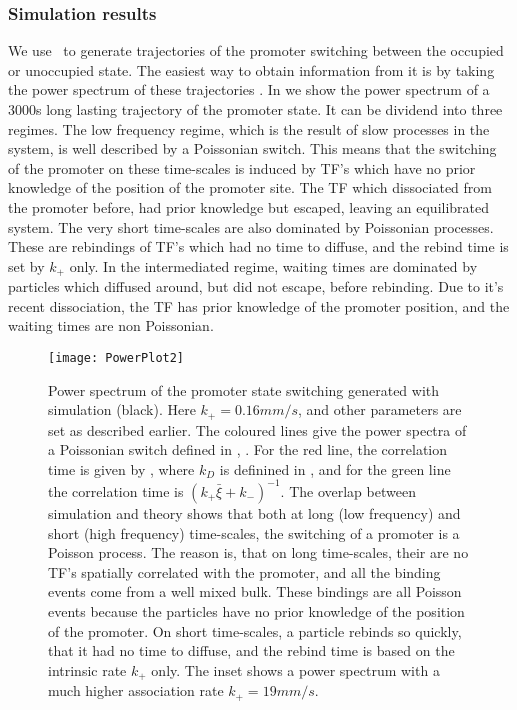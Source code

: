 \subsubsection{Simulation results}
We use \GFRD\, to generate trajectories of the promoter switching between the occupied or unoccupied state. The easiest way to obtain information from it is by taking the power spectrum of these trajectories \cite{Tkacik2009,VanZon2006}. In  we show the power spectrum of a 3000s long lasting trajectory of the promoter state. It can be dividend into three regimes. The low frequency regime, which is the result of slow processes in the system, is well described by a Poissonian switch. This means that the switching of the promoter on these time-scales is induced by TF's which have no prior knowledge of the position of the promoter site. The TF which dissociated from the promoter before, had prior knowledge but escaped, leaving an equilibrated system. The very short time-scales are also dominated by Poissonian processes. These are rebindings of TF's which had no time to diffuse, and the rebind time is set by $k_+$ only. In the intermediated regime, waiting times are dominated by particles which diffused around, but did not escape, before rebinding. Due to it's recent dissociation, the TF has prior knowledge of the promoter position, and the waiting times are non Poissonian.

\begin{figure}
\texttt{[image: PowerPlot2]}
\caption{ Power spectrum of the promoter state switching generated with simulation (black). Here $k_+=0.16mm/s$, and other parameters are set as described earlier. The coloured lines give the power spectra of a Poissonian switch defined in , . For the red line, the correlation time is given by , where $k_D$ is definined in , and for the green line the correlation time is $(k_+ \bar{\xi}+k_-)^{-1}$. The overlap between simulation and theory shows that both at long (low frequency) and short (high frequency) time-scales, the switching of a promoter is a Poisson process. The reason is, that on long time-scales, their are no TF's spatially correlated with the promoter, and all the binding events come from a well mixed bulk. These bindings are all Poisson events because the particles have no prior knowledge of the position of the promoter. On short time-scales, a particle rebinds so quickly, that it had no time to diffuse, and the rebind time is based on the intrinsic rate $k_+$ only. The inset shows a power spectrum with a much higher association rate $k_+=19 mm/s$. 
}
\end{figure}

